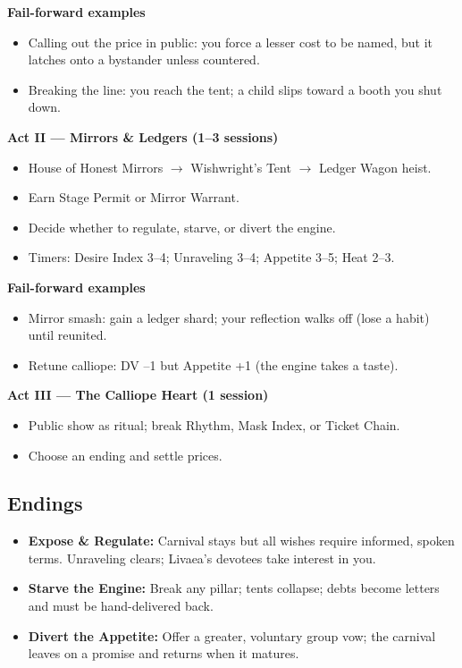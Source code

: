 \documentclass[11pt]{article}
\newcommand{\divider}{\vspace{12pt}\noindent\makebox[\linewidth]{\rule{\textwidth}{0.4pt}}\vspace{12pt}}
\begin{document}
\textbf{Fail-forward examples}
\begin{itemize}
\item Calling out the price in public: you force a lesser cost to be named, but it latches onto a bystander unless countered.
\item Breaking the line: you reach the tent; a child slips toward a booth you shut down.
\end{itemize}

\textbf{Act II --- Mirrors \& Ledgers (1--3 sessions)}
\begin{itemize}
\item House of Honest Mirrors $\rightarrow$ Wishwright's Tent $\rightarrow$ Ledger Wagon heist.
\item Earn Stage Permit or Mirror Warrant.
\item Decide whether to regulate, starve, or divert the engine.
\item Timers: Desire Index 3--4; Unraveling 3--4; Appetite 3--5; Heat 2--3.
\end{itemize}

\textbf{Fail-forward examples}
\begin{itemize}
\item Mirror smash: gain a ledger shard; your reflection walks off (lose a habit) until reunited.
\item Retune calliope: DV --1 but Appetite +1 (the engine takes a taste).
\end{itemize}

\textbf{Act III --- The Calliope Heart (1 session)}
\begin{itemize}
\item Public show as ritual; break Rhythm, Mask Index, or Ticket Chain.
\item Choose an ending and settle prices.
\end{itemize}

\divider

\subsection*{Endings}
\begin{itemize}
\item \textbf{Expose \& Regulate:} Carnival stays but all wishes require informed, spoken terms. Unraveling clears; Livaea's devotees take interest in you.
\item \textbf{Starve the Engine:} Break any pillar; tents collapse; debts become letters and must be hand-delivered back.
\item \textbf{Divert the Appetite:} Offer a greater, voluntary group vow; the carnival leaves on a promise and returns when it matures.
\end{itemize}
\end{document}
